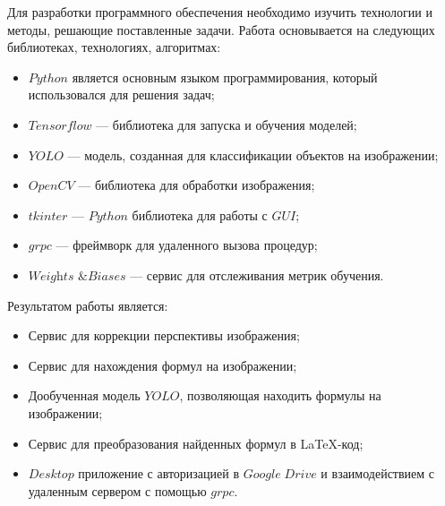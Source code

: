 Для разработки программного обеспечения необходимо изучить технологии и методы, решающие поставленные задачи. Работа основывается на следующих библиотеках, технологиях, алгоритмах:
\begin{itemize}
    \item $Python$ является основным языком программирования, который использовался для решения задач;
    \item $Tensorflow$ --- библиотека для запуска и обучения моделей;
    \item $YOLO$ --- модель, созданная для классификации объектов на изображении;
    \item $OpenCV$ --- библиотека для обработки изображения;
    \item $tkinter$ --- $Python$ библиотека для работы с $GUI$;
    \item $grpc$ --- фреймворк для удаленного вызова процедур;
    \item $\textit{Weights \& Biases}$ --- сервис для отслеживания метрик обучения.
\end{itemize}

Результатом работы является:
\begin{itemize}
    \item Сервис для коррекции перспективы изображения;
    \item Сервис для нахождения формул на изображении;
    \item Дообученная модель $YOLO$, позволяющая находить формулы на изображении;
    \item Сервис для преобразования найденных формул в \LaTeX-код;
    \item $Desktop$ приложение с авторизацией в $Google\; Drive$ и взаимодействием с удаленным сервером с помощью $grpc$.
\end{itemize}
